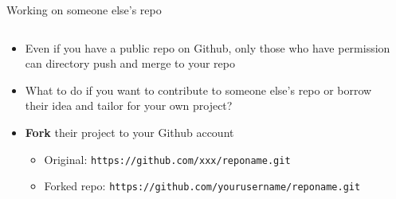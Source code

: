 \documentclass[handout,pdftex,10pt,aspectratio=169]{beamer}
\begin{document}
\begin{frame}{Working on someone else's repo}
  \begin{columns}[c]
    \begin{column}{0.55\linewidth}
      \begin{itemize}[<+->]\setlength\itemsep{10pt}
        \setlength{\leftmarginii}{10pt}
        \item Even if you have a public repo on Github, only those who have permission 
        can directory push and merge to your repo
        \item What to do if you want to contribute to someone else's repo or borrow their idea and 
        tailor for your own project?
        \item \textbf{Fork} their project to your Github account
        \begin{itemize}
          \item Original: \texttt{https://github.com/xxx/reponame.git}
          \item Forked repo: \texttt{https://github.com/yourusername/reponame.git}
        \end{itemize}
      \end{itemize}
        \end{column}\hfill
    \begin{column}{0.44\linewidth}
      \centering
      \end{column}
  \end{columns}
\end{frame}
\end{document}

